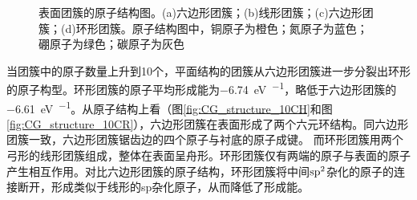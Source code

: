 \begin{figure}[htb]
{            \label{fig:CG_structure_10CR}
        }
        \caption{表面团簇的原子结构图。(a)六边形团簇；(b)线形团簇；(c)六边形团簇；(d)环形团簇。原子结构图中，铜原子为橙色；氮原子为蓝色；硼原子为绿色；碳原子为灰色}
        \label{fig:CG_CG_structure_6-10C}
    \end{figure}

    当团簇中的原子数量上升到10个，平面结构的团簇从六边形团簇进一步分裂出环形的原子构型。环形团簇的原子平均形成能为\SI{-6.74}{\electronvolt\per\atom}，略低于六边形团簇的\SI{-6.61}{\electronvolt\per\atom}。从原子结构上看（图\ref{fig:CG_structure_10CH}和图\ref{fig:CG_structure_10CR}），六边形团簇在表面形成了两个六元环结构。同六边形团簇一致，六边形团簇锯齿边的四个原子与衬底的原子成键。
    而环形团簇用两个弓形的线形团簇组成，整体在表面呈舟形。环形团簇仅有两端的原子与表面的原子产生相互作用。对比六边形团簇的原子结构，环形团簇将中间$\rm sp^2$杂化的原子的连接断开，形成类似于线形的sp杂化原子，从而降低了形成能。
    

